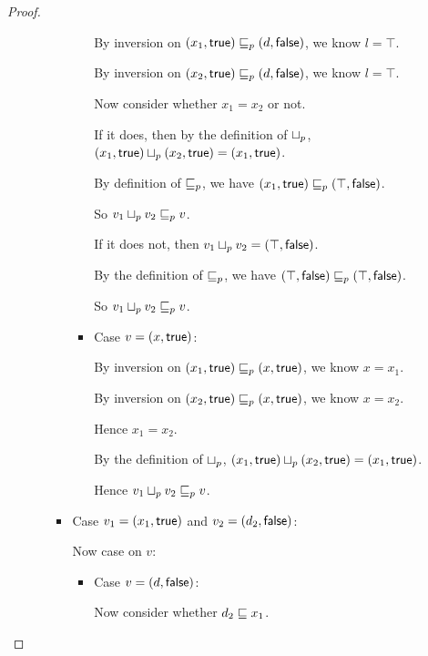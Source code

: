 \begin{proof}
\begin{enumerate}
\begin{enumerate}
\begin{itemize}
\begin{itemize}
          By inversion on $(x_1, \textsf{true}) \sqsubseteq_p
          (d, \textsf{false})$, we know $l = \top$.

          By inversion on $(x_2, \textsf{true}) \sqsubseteq_p
          (d, \textsf{false})$, we know $l = \top$.

          Now consider whether $x_1 = x_2$ or not.
        
          If it does, then by the definition of $ \sqcup_p $,
          $(x_1, \textsf{true})  \sqcup_p  (x_2, \textsf{true})
          = (x_1, \textsf{true})$.

          By definition of $\sqsubseteq_p$, we have $(x_1, \textsf{true})
          \sqsubseteq_p (\top, \textsf{false})$.

          So $v_1 \sqcup_p v_2 \sqsubseteq_p v$.

          If it does not, then $v_1 \sqcup_p v_2 =
          (\top, \textsf{false})$.

          By the definition of $\sqsubseteq_p$, we have
          $(\top, \textsf{false}) \sqsubseteq_p
          (\top, \textsf{false})$.

          So $v_1 \sqcup_p v_2 \sqsubseteq_p v$.
          
        \item Case $v = (x, \textsf{true})$: 
          
          By inversion on $(x_1, \textsf{true}) \sqsubseteq_p
          (x, \textsf{true})$, we know $x = x_1$.

          By inversion on $(x_2, \textsf{true}) \sqsubseteq_p
          (x, \textsf{true})$, we know $x = x_2$.

          Hence $x_1 = x_2$.

          By the definition of $ \sqcup_p $, $(x_1, \textsf{true})
           \sqcup_p  (x_2, \textsf{true}) =
          (x_1, \textsf{true})$.

          Hence $v_1 \sqcup_p v_2 \sqsubseteq_p v$.
        \end{itemize}
        
      \item Case $v_1 = (x_1, \textsf{true})$ and $v_2 =
        (d_2, \textsf{false})$:
        
        Now case on $v$:
        \begin{itemize}
        \item Case $v = (d, \textsf{false})$:
          
          Now consider whether $d_2 \sqsubseteq x_1$.


\end{itemize}
\end{itemize}
\end{enumerate}
\end{enumerate}
\end{proof}
